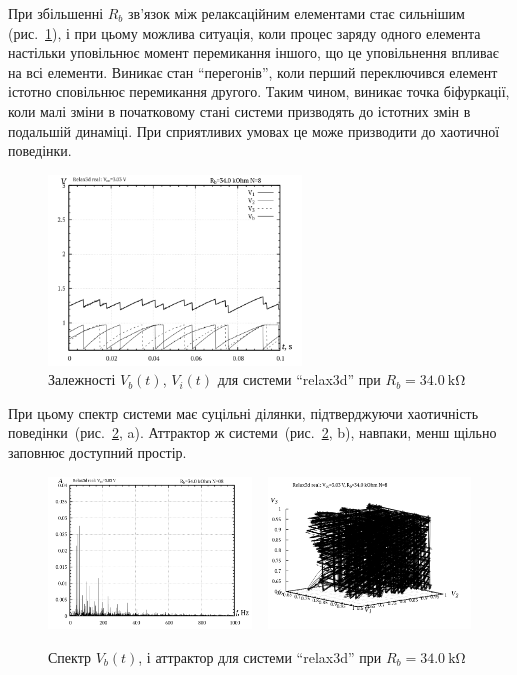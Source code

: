 При збільшенні
$R_b$ зв'язок між релаксаційним елементами стає сильнішим
(рис.~\ref{atu:f:relax3d_t_08}), і при цьому можлива ситуація, коли процес
заряду одного елемента настільки уповільнює момент перемикання
іншого, що це уповільнення впливає на всі елементи. Виникає стан
``перегонів'', коли перший переключився елемент істотно сповільнює
перемикання другого. Таким чином, виникає точка біфуркації,
коли малі зміни в початковому стані системи призводять до
істотних змін в подальшій динаміці. При сприятливих умовах
це може призводити до хаотичної поведінки.


\begin{figure}[htb!]
  \centerline{\includegraphics[width=0.6\textwidth]{p/relax3d_t_08.png} }
\caption{Залежності $ V_b (t) $, $ V_i (t) $ для системи ``relax3d'' при $ R_b = \SI{34.0}{\kilo\ohm} $}
\label{atu:f:relax3d_t_08}
\end{figure}

При цьому спектр системи має суцільні ділянки, підтверджуючи
хаотичність поведінки~(рис.~\ref{atu:f:relax3d_f_08}, a). Аттрактор ж
системи~(рис.~\ref{atu:f:relax3d_f_08}, b), навпаки, менш щільно заповнює
доступний простір.

\begin{figure}[htb!]
  \centerline{
    \includegraphics[width=0.48\textwidth]{p/relax3d_f_08.png}
    ~
    \includegraphics[width=0.48\textwidth]{p/relax3d_v1v2v3_08.png}
  }
\caption{Спектр $ V_b (t) $, і аттрактор для системи ``relax3d'' при $ R_b = \SI{34.0}{\kilo\ohm} $}
  \label{atu:f:relax3d_f_08}
\end{figure}

